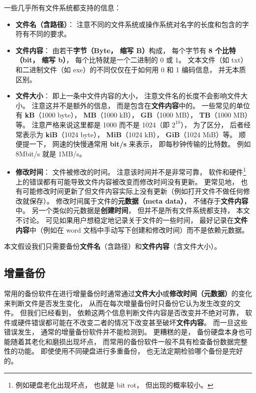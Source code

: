 一些几乎所有文件系统都支持的信息：
\begin{itemize}
\item \textbf{文件名（含路径）}： 注意不同的文件系统或操作系统对名字的长度和包含的字符有不同的要求。
\item \textbf{文件内容}： 由若干\textbf{字节（Byte， 缩写 B）}构成， 每个字节有 \textbf{8 个比特（bit， 缩写 b）}， 每个比特就是一个二进制的 0 或 1。 文本文件（如 txt）和二进制文件（如 exe）的不同仅仅在于如何用 0 和 1 编码信息， 并无本质区别。
\item \textbf{文件大小}： 即上一条中文件内容的大小， 注意文件名的长度不会影响文件大小。 注意这并不是额外的信息， 而是包含在\textbf{文件内容}中的。 一些常见的单位有 \textbf{kB}（1000 byte）， \textbf{MB}（1000 kB）， \textbf{GB}（1000 MB）， \textbf{TB}（1000 MB）等。 注意严格来说这里都是 1000 而不是 1024（即 $2^{10}$）， 为了区分， 后者经常表示为 \textbf{kiB}（1024 byte）， \textbf{MiB}（1024 kB）， \textbf{GiB}（1024 MiB）等。 顺便提一下， 网速的快慢通常用 \textbf{bit/s} 来表示， 即每秒钟传输的比特数。 例如 8Mbit/s 就是 1MB/s。
\item \textbf{修改时间}： 文件被修改的时间。 注意该时间并不是非常可靠， 软件和硬件\footnote{例如硬盘老化出现坏点， 也就是 bit rot， 但出现的概率较小。}上的错误都有可能导致文件内容被改变而修改时间没有更新。 更常见地， 也有可能修改时间更新了但文件内容实际上没有更新（例如打开文件不做任何修改就保存）。 修改时间属于文件的\textbf{元数据（meta data）}， 不储存于\textbf{文件内容}中。 另一个类似的元数据是\textbf{创建时间}， 但并不是所有文件系统都支持， 本文不讨论。 可见如果用户想稳定地记录关于文件的一些时间， 最好记录在\textbf{文件内容}中（例如在 word 文档中手动写下创建和修改时间）而不是依赖元数据。
\end{itemize}

本文假设我们只需要备份\textbf{文件名}（含路径）和\textbf{文件内容}（含文件大小）。

\subsection{增量备份}
常用的备份软件在进行增量备份时通常通过\textbf{文件大小}或\textbf{修改时间（元数据）}的变化来判断文件是否发生变化， 从而在每次增量备份时只备份它认为发生改变的文件。 但我们已经看到， 依赖这两个信息判断文件内容是否改变并不绝对可靠， 软件或硬件错误都可能在不改变二者的情况下改变甚至破坏\textbf{文件内容}。 而一旦这些错误发生， 通常的增量备份软件并不能检测到。 更糟糕的是， 备份硬盘本身也可能随着其老化和磨损出现坏点， 而常用的备份软件一般不具有检查备份数据完整性的功能。 即使使用不同硬盘进行多重备份， 也无法定期检验哪个备份是完好的。

